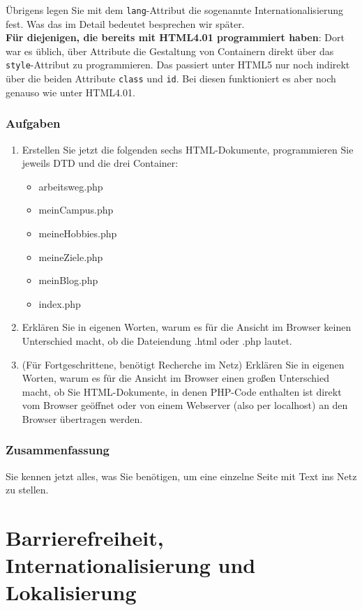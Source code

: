 Übrigens legen Sie mit dem \verb|lang|-Attribut die sogenannte Internationalisierung fest. Was das im Detail bedeutet besprechen wir später.\\

\textbf{Für diejenigen, die bereits mit HTML4.01 programmiert haben}: Dort war es üblich, über Attribute die Gestaltung von Containern direkt über das \verb|style|-Attribut zu programmieren. Das passiert unter HTML5 nur noch indirekt über die beiden Attribute \verb|class| und \verb|id|. Bei diesen funktioniert es aber noch genauso wie unter HTML4.01.

\subsubsection{Aufgaben}

\begin{enumerate}
	\item Erstellen Sie jetzt die folgenden sechs HTML-Dokumente, programmieren Sie jeweils DTD und die drei Container:
	\begin{itemize}
		\item arbeitsweg.php
		\item meinCampus.php
		\item meineHobbies.php
		\item meineZiele.php
		\item meinBlog.php
		\item index.php
	\end{itemize}
	\item Erklären Sie in eigenen Worten, warum es für die Ansicht im Browser keinen Unterschied macht, ob die Dateiendung .html oder .php lautet.
	\item (Für Fortgeschrittene, benötigt Recherche im Netz) Erklären Sie in eigenen Worten, warum es für die Ansicht im Browser einen großen Unterschied macht, ob Sie HTML-Dokumente, in denen PHP-Code enthalten ist direkt vom Browser geöffnet oder von einem Webserver (also per localhost) an den Browser übertragen werden.
\end{enumerate}

\subsubsection{Zusammenfassung}

Sie kennen jetzt alles, was Sie benötigen, um eine einzelne Seite mit Text ins Netz zu stellen.

\section{Barrierefreiheit, Internationalisierung und Lokalisierung}

